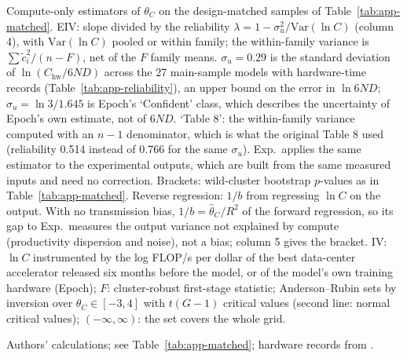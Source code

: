 \begin{table}[tp]
\begin{tablenotes}
Compute-only estimators of $\theta_C$ on the design-matched samples of Table~\ref{tab:app-matched}. EIV: slope divided by the reliability $\lambda=1-\sigma_u^2/\text{Var}(\ln C)$ (column 4), with $\text{Var}(\ln C)$ pooled or within family; the within-family variance is $\sum\tilde c_i^2/(n-F)$, net of the $F$ family means. $\sigma_u=0.29$ is the standard deviation of $\ln(C_{\text{hw}}/6ND)$ across the 27 main-sample models with hardware-time records (Table~\ref{tab:app-reliability}), an upper bound on the error in $\ln 6ND$; $\sigma_u=\ln3/1.645$ is Epoch's `Confident' class, which describes the uncertainty of Epoch's own estimate, not of $6ND$. `Table 8': the within-family variance computed with an $n-1$ denominator, which is what the original Table 8 used (reliability 0.514 instead of 0.766 for the same $\sigma_u$). Exp.\ applies the same estimator to the experimental outputs, which are built from the same measured inputs and need no correction. Brackets: wild-cluster bootstrap $p$-values as in Table~\ref{tab:app-matched}. Reverse regression: $1/b$ from regressing $\ln C$ on the output. With no transmission bias, $1/b=\hat\theta_C/R^2$ of the forward regression, so its gap to Exp.\ measures the output variance not explained by compute (productivity dispersion and noise), not a bias; column 5 gives the bracket. IV: $\ln C$ instrumented by the log FLOP/s per dollar of the best data-center accelerator released six months before the model, or of the model's own training hardware (Epoch); $F$: cluster-robust first-stage statistic; Anderson--Rubin sets by inversion over $\theta_C\in[-3,4]$ with $t(G-1)$ critical values (second line: normal critical values); $(-\infty,\infty)$: the set covers the whole grid.
\end{tablenotes}
\begin{tablenotes}[Source]
Authors' calculations; see Table~\ref{tab:app-matched}; hardware records from \citet{epochai2026data}.
\end{tablenotes}
\end{table}
